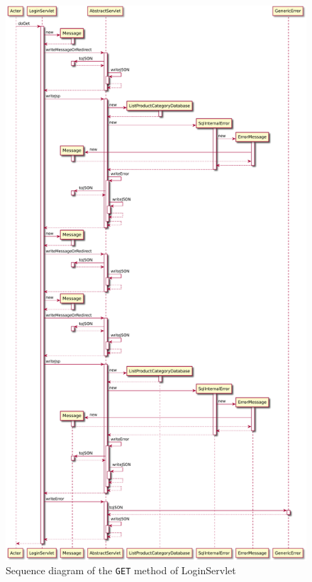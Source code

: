 \begin{figure}[H]
    \centering
    \includegraphics[width=\textwidth,height=0.95\textheight,keepaspectratio]{Schemas/LoginServlet_doGet.svg.pdf}
    \caption{Sequence diagram of the \texttt{GET} method of LoginServlet}
    \label{fig:LoginServlet_doGet}
\end{figure}
